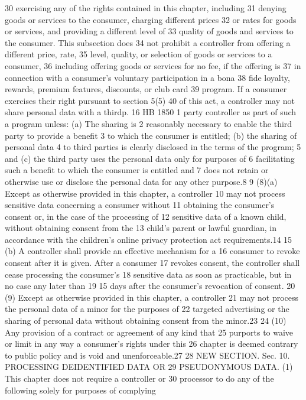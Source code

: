 30 exercising any of the rights contained in this chapter, including
31 denying goods or services to the consumer, charging different prices
32 or rates for goods or services, and providing a different level of
33 quality of goods and services to the consumer. This subsection does
34 not prohibit a controller from offering a different price, rate,
35 level, quality, or selection of goods or services to a consumer,
36 including offering goods or services for no fee, if the offering is
37 in connection with a consumer's voluntary participation in a bona
38 fide loyalty, rewards, premium features, discounts, or club card
39 program. If a consumer exercises their right pursuant to section 5(5)
40 of this act, a controller may not share personal data with a thirdp. 16 HB 1850
1 party controller as part of such a program unless: (a) The sharing is
2 reasonably necessary to enable the third party to provide a benefit
3 to which the consumer is entitled; (b) the sharing of personal data
4 to third parties is clearly disclosed in the terms of the program;
5 and (c) the third party uses the personal data only for purposes of
6 facilitating such a benefit to which the consumer is entitled and
7 does not retain or otherwise use or disclose the personal data for
any other purpose.8
9 (8)(a) Except as otherwise provided in this chapter, a controller
10 may not process sensitive data concerning a consumer without
11 obtaining the consumer's consent or, in the case of the processing of
12 sensitive data of a known child, without obtaining consent from the
13 child's parent or lawful guardian, in accordance with the children's
online privacy protection act requirements.14
15 (b) A controller shall provide an effective mechanism for a
16 consumer to revoke consent after it is given. After a consumer
17 revokes consent, the controller shall cease processing the consumer's
18 sensitive data as soon as practicable, but in no case any later than
19 15 days after the consumer's revocation of consent.
20 (9) Except as otherwise provided in this chapter, a controller
21 may not process the personal data of a minor for the purposes of
22 targeted advertising or the sharing of personal data without
obtaining consent from the minor.23
24 (10) Any provision of a contract or agreement of any kind that
25 purports to waive or limit in any way a consumer's rights under this
26 chapter is deemed contrary to public policy and is void and
unenforceable.27
28 NEW SECTION. Sec. 10. PROCESSING DEIDENTIFIED DATA OR
29 PSEUDONYMOUS DATA. (1) This chapter does not require a controller or
30 processor to do any of the following solely for purposes of complying
